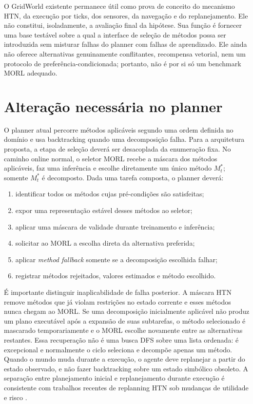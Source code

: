 O GridWorld existente permanece útil como prova de conceito do mecanismo HTN,
da execução por ticks, dos sensores, da navegação e do replanejamento.
Ele não constitui, isoladamente, a avaliação final da hipótese.
Sua função é fornecer uma base testável sobre a qual a interface de seleção de
métodos possa ser introduzida sem misturar falhas do planner com falhas de
aprendizado.
Ele ainda não oferece alternativas genuinamente conflitantes, recompensa
vetorial, nem um protocolo de preferência-condicionada; portanto, não é por si
só um benchmark MORL adequado.

\section{Alteração necessária no planner}

O planner atual percorre métodos aplicáveis segundo uma ordem definida no
domínio e usa backtracking quando uma decomposição falha.
Para a arquitetura proposta, a etapa de seleção deverá ser desacoplada da
enumeração fixa.
No caminho online normal, o seletor MORL recebe a máscara dos métodos aplicáveis,
faz uma inferência e escolhe diretamente um único método $M_t^*$; somente $M_t^*$ é
decomposto.
Dada uma tarefa composta, o planner deverá:

\begin{enumerate}
\item identificar todos os métodos cujas pré-condições são satisfeitas;
\item expor uma representação estável desses métodos ao seletor;
\item aplicar uma máscara de validade durante treinamento e inferência;
\item solicitar ao MORL a escolha direta da alternativa preferida;
\item aplicar \emph{method fallback} somente se a decomposição escolhida falhar;
\item registrar métodos rejeitados, valores estimados e método escolhido.
\end{enumerate}

É importante distinguir inaplicabilidade de falha posterior.
A máscara HTN remove métodos que já violam restrições no estado corrente e esses
 métodos nunca chegam ao MORL. Se uma decomposição inicialmente aplicável não
 produz um plano executável após a expansão de suas subtarefas, o método
 selecionado é mascarado temporariamente e o MORL escolhe novamente entre as
 alternativas restantes.
 Essa recuperação não é uma busca DFS sobre uma lista ordenada: é excepcional e
normalmente o ciclo seleciona e decompõe apenas um método.
Quando o mundo muda durante a execução, o agente deve replanejar a partir do
estado observado, e não fazer backtracking sobre um estado simbólico obsoleto.
A separação entre planejamento inicial e replanejamento durante execução é
consistente com trabalhos recentes de replanning HTN sob mudanças de utilidade
e risco \cite{nabakowski2025}.


